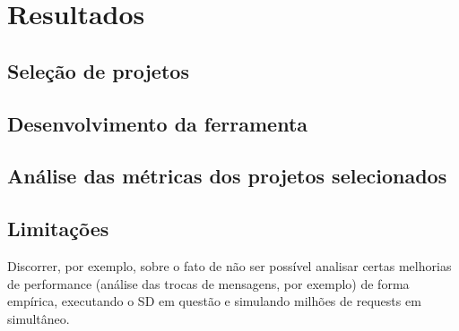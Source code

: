 \chapter{Resultados}
\label{chapter:results}

\section{Seleção de projetos}


\section{Desenvolvimento da ferramenta}


\section{Análise das métricas dos projetos selecionados}



\section{Limitações}
\label{sec:limitacoes}

Discorrer, por exemplo, sobre o fato de não ser possível analisar certas melhorias de performance (análise das trocas de mensagens, por exemplo) de forma empírica, executando o SD em questão e simulando milhões de requests em simultâneo.
